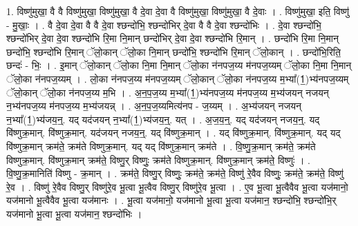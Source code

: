 \documentclass[17pt]{extarticle}
\begin{document}
1. विष्णु॑मुखा॒ वै वै विष्णु॑मुखा॒ विष्णु॑मुखा॒ वै दे॒वा दे॒वा वै विष्णु॑मुखा॒ विष्णु॑मुखा॒ वै दे॒वाः । . विष्णु॑मुखा॒ इति॒ विष्णु॑ - मु॒खाः॒ । . वै दे॒वा दे॒वा वै वै दे॒वा श्छन्दो॑भि॒ श्छन्दो॑भिर् दे॒वा वै वै दे॒वा श्छन्दो॑भिः । . दे॒वा श्छन्दो॑भि॒ श्छन्दो॑भिर् दे॒वा दे॒वा श्छन्दो॑भि रि॒मा नि॒मान् छन्दो॑भिर् दे॒वा दे॒वा श्छन्दो॑भि रि॒मान् । . छन्दो॑भि रि॒मा नि॒मान् छन्दो॑भि॒ श्छन्दो॑भि रि॒मान् ॅलो॒कान् ॅलो॒का नि॒मान् छन्दो॑भि॒ श्छन्दो॑भि रि॒मान् ॅलो॒कान् । . छन्दो॑भि॒रिति॒ छन्दः॑ - भिः॒ । . इ॒मान् ॅलो॒कान् ॅलो॒का नि॒मा नि॒मान् ॅलो॒का न॑नपज॒य्य म॑नपज॒य्यम् ॅलो॒का नि॒मा नि॒मान् ॅलो॒का न॑नपज॒य्यम् । . लो॒का न॑नपज॒य्य म॑नपज॒य्यम् ॅलो॒कान् ॅलो॒का न॑नपज॒य्य म॒भ्या᳚(1॒)भ्य॑नपज॒य्यम् ॅलो॒कान् ॅलो॒का न॑नपज॒य्य म॒भि । . अ॒न॒प॒ज॒य्य म॒भ्या᳚(1॒)भ्य॑नपज॒य्य म॑नपज॒य्य म॒भ्य॑जयन् नजयन् न॒भ्य॑नपज॒य्य म॑नपज॒य्य म॒भ्य॑जयन्न् । . अ॒न॒प॒ज॒य्यमित्य॑नप - ज॒य्यम् । . अ॒भ्य॑जयन् नजयन् न॒भ्या᳚(1॒)भ्य॑जय॒न्॒. यद् यद॑जयन् न॒भ्या᳚(1॒)भ्य॑जय॒न्॒. यत् । . अ॒ज॒य॒न्॒. यद् यद॑जयन् नजय॒न्॒. यद् वि॑ष्णुक्र॒मान्. वि॑ष्णुक्र॒मान्. यद॑जयन् नजय॒न्॒. यद् वि॑ष्णुक्र॒मान् । . यद् वि॑ष्णुक्र॒मान्. वि॑ष्णुक्र॒मान्. यद् यद् वि॑ष्णुक्र॒मान् क्रम॑ते॒ क्रम॑ते विष्णुक्र॒मान्. यद् यद् वि॑ष्णुक्र॒मान् क्रम॑ते । . वि॒ष्णु॒क्र॒मान् क्रम॑ते॒ क्रम॑ते विष्णुक्र॒मान्. वि॑ष्णुक्र॒मान् क्रम॑ते॒ विष्णु॒र् विष्णुः॒ क्रम॑ते विष्णुक्र॒मान्. वि॑ष्णुक्र॒मान् क्रम॑ते॒ विष्णुः॑ । . वि॒ष्णु॒क्र॒मानिति॑ विष्णु - क्र॒मान् । . क्रम॑ते॒ विष्णु॒र् विष्णुः॒ क्रम॑ते॒ क्रम॑ते॒ विष्णु॑ रे॒वैव विष्णुः॒ क्रम॑ते॒ क्रम॑ते॒ विष्णु॑ रे॒व । . विष्णु॑ रे॒वैव विष्णु॒र् विष्णु॑रे॒व भू॒त्वा भू॒त्वैव विष्णु॒र् विष्णु॑रे॒व भू॒त्वा । . ए॒व भू॒त्वा भू॒त्वैवैव भू॒त्वा यज॑मानो॒ यज॑मानो भू॒त्वैवैव भू॒त्वा यज॑मानः । . भू॒त्वा यज॑मानो॒ यज॑मानो भू॒त्वा भू॒त्वा यज॑मान॒ श्छन्दो॑भि॒ श्छन्दो॑भि॒र् यज॑मानो भू॒त्वा भू॒त्वा यज॑मान॒ श्छन्दो॑भिः । \newline
\end{document}
